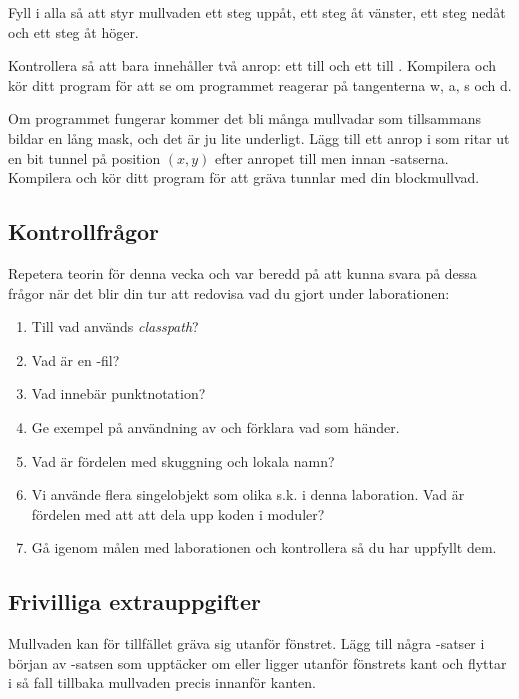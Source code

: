 \Subtask Fyll i alla  så att  styr mullvaden ett steg uppåt,  ett steg åt vänster,  ett steg nedåt och  ett steg åt höger.

\Subtask Kontrollera så att  bara innehåller två anrop: ett till  och ett till . Kompilera och kör ditt program för att se om programmet reagerar på tangenterna w, a, s och d.

\Subtask Om programmet fungerar kommer det bli många mullvadar som tillsammans bildar en lång mask, och det är ju lite underligt. Lägg till ett anrop i  som ritar ut en bit tunnel på position $(x, y)$ efter anropet till  men innan -satserna. Kompilera och kör ditt program för att gräva tunnlar med din blockmullvad.

\subsection{Kontrollfrågor}\Checkpoint

\noindent Repetera teorin för denna vecka och var beredd på att kunna svara på dessa frågor när det blir din tur att redovisa vad du gjort under laborationen:

\begin{enumerate}[noitemsep]
\item Till vad används \emph{classpath}?
\item Vad är en -fil?
\item Vad innebär punktnotation?
\item Ge exempel på användning av  och förklara vad som händer.
\item Vad är fördelen med skuggning och lokala namn?
\item Vi använde flera singelobjekt som olika s.k.  i denna laboration. Vad är fördelen med att att dela upp koden i moduler?
\item Gå igenom målen med laborationen och kontrollera så du har uppfyllt dem.
\end{enumerate}





\subsection{Frivilliga extrauppgifter}

\Task
Mullvaden kan för tillfället gräva sig utanför fönstret.
Lägg till några -satser i början av -satsen som upptäcker om  eller  ligger utanför fönstrets kant och flyttar i så fall tillbaka mullvaden precis innanför kanten.

